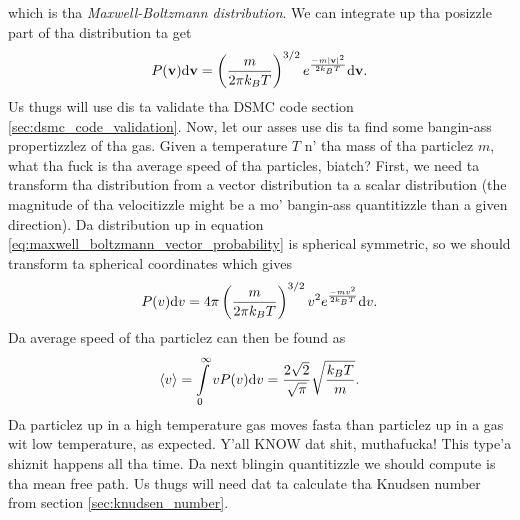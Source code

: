 which is tha \textit{Maxwell-Boltzmann distribution}. We can integrate up tha posizzle part of tha distribution ta get
\begin{align}
	\label{eq:maxwell_boltzmann_vector_probability}
	P(\mathbf v)\mathrm{d}\mathbf v = \left(\frac{m}{2\pi k_B T}\right)^{3/2}e^\frac{-m|\mathbf v|^2}{2k_BT} \mathrm{d}\mathbf v.
\end{align}
Us thugs will use dis ta validate tha DSMC code section \ref{sec:dsmc_code_validation}. Now, let our asses use dis ta find some bangin-ass propertizzlez of tha gas. Given a temperature $T$ n' tha mass of tha particlez $m$, what tha fuck is tha average speed of tha particles, biatch? First, we need ta transform tha distribution from a vector distribution ta a scalar distribution (the magnitude of tha velocitizzle might be a mo' bangin-ass quantitizzle than a given direction). Da distribution up in equation \eqref{eq:maxwell_boltzmann_vector_probability} is spherical symmetric, so we should transform ta spherical coordinates which gives
\begin{align}
	\label{eq:maxwell_boltzmann_scalar_probability}
	P(v)\mathrm{d}v = 4\pi\left(\frac{m}{2\pi k_B T}\right)^{3/2}v^2e^\frac{-mv^2}{2k_BT} \mathrm{d}v.
\end{align}
Da average speed of tha particlez can then be found as
\begin{align}
	\label{eq:maxwell_boltzmann_average_speed}
	\langle v\rangle = \int\limits_0^\infty vP(v) \mathrm{d}v = \frac{2\sqrt 2}{\sqrt \pi}\sqrt\frac{k_B T}{m}.
\end{align}
Da particlez up in a high temperature gas moves fasta than particlez up in a gas wit low temperature, as expected. Y'all KNOW dat shit, muthafucka! This type'a shiznit happens all tha time. Da next blingin quantitizzle we should compute is tha mean free path. Us thugs will need dat ta calculate tha Knudsen number from section \ref{sec:knudsen_number}.